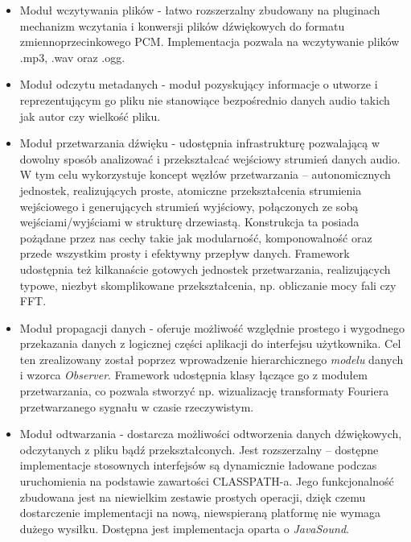 \begin{itemize}

\item Moduł wczytywania plików - łatwo rozszerzalny zbudowany na pluginach mechanizm wczytania i konwersji plików dźwiękowych do formatu zmiennoprzecinkowego PCM. Implementacja pozwala na wczytywanie plików .mp3, .wav oraz .ogg.

\item Moduł odczytu metadanych - moduł pozyskujący informacje o utworze i reprezentującym go pliku nie stanowiące bezpośrednio danych audio takich jak autor czy wielkość pliku.

\item Moduł przetwarzania dźwięku - udostępnia infrastrukturę pozwalającą w dowolny sposób analizować i
przekształcać wejściowy strumień danych audio. W tym celu wykorzystuje koncept węzłów przetwarzania
-- autonomicznych jednostek, realizujących proste, atomiczne przekształcenia strumienia wejściowego
i generujących strumień wyjściowy, połączonych ze sobą wejściami/wyjściami w strukturę drzewiastą. Konstrukcja ta posiada pożądane przez nas cechy takie jak modularność, komponowalność oraz przede wszystkim prosty i efektywny przepływ danych. Framework udostępnia też kilkanaście gotowych jednostek przetwarzania, realizujących typowe, niezbyt skomplikowane przekształcenia, np. obliczanie mocy fali czy FFT.

\item Moduł propagacji danych -  oferuje możliwość względnie prostego i wygodnego przekazania danych z
logicznej części aplikacji do interfejsu użytkownika. Cel ten zrealizowany został poprzez wprowadzenie hierarchicznego \emph{modelu} danych i wzorca \emph{Observer}. Framework udostępnia klasy
łączące go z modułem przetwarzania, co pozwala stworzyć np. wizualizację transformaty Fouriera
przetwarzanego sygnału w czasie rzeczywistym.

\item Moduł odtwarzania - dostarcza możliwości odtworzenia danych dźwiękowych, odczytanych z pliku bądź
przekształconych. Jest rozszerzalny -- dostępne implementacje stosownych interfejsów są dynamicznie
ładowane podczas uruchomienia na podstawie zawartości CLASSPATH-a. Jego funkcjonalność zbudowana
jest na niewielkim zestawie prostych operacji, dzięk czemu dostarczenie implementacji na nową,
niewspieraną platformę nie wymaga dużego wysiłku. Dostępna jest implementacja oparta o
\textit{JavaSound}.
\end{itemize}

